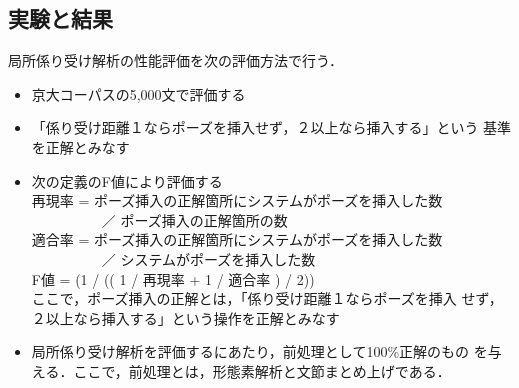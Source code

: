 \setcounter{table}{2}

\subsection{実験と結果}

局所係り受け解析の性能評価を次の評価方法で行う．
\begin{itemize}
  \item 京大コーパスの5,000文で評価する

  \item 「係り受け距離１ならポーズを挿入せず，２以上なら挿入する」という
	基準を正解とみなす

  \item 次の定義のF値により評価する\\
        再現率 = ポーズ挿入の正解箇所にシステムがポーズを挿入した数\\
        　　　　　／ ポーズ挿入の正解箇所の数\\
        適合率 = ポーズ挿入の正解箇所にシステムがポーズを挿入した数\\
	　　　　　／ システムがポーズを挿入した数\\
        F値 = (1 / (( 1 / 再現率 + 1 / 適合率 ) / 2))\\
	ここで，ポーズ挿入の正解とは，「係り受け距離１ならポーズを挿入
        せず，２以上なら挿入する」という操作を正解とみなす

  \item 局所係り受け解析を評価するにあたり，前処理として100\%正解のもの
	を与える．ここで，前処理とは，形態素解析と文節まとめ上げである．
\end{itemize}


